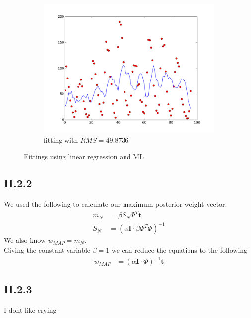 \documentclass{article}
\begin{document}
\begin{figure}[!ht]
\begin{subfigure}[b]{0.5\textwidth}
        \includegraphics[width=\textwidth]{Part2/II213.png}
        \caption{fitting with $RMS = 49.8736$}
    \end{subfigure}
    \caption{Fittings using linear regression and ML}
    \label{fig:II21}
\end{figure}


\subsection{II.2.2}

We used the following to calculate our maximum posterior weight vector.\\
\begin{align*}
    m_{N} &= \beta S_{N} \Phi^{T} \textbf{t}\\
    S_{N} &= (\alpha \textbf{I} \cdot \beta \Phi^{T} \Phi)^{-1}
\end{align*}
We also know $w_{MAP} = m_N$.\\
Giving the constant variable $\beta = 1$ we can reduce the equations to the following\\
\begin{align*}
    w_{MAP} &= (\alpha \textbf{I} \cdot \Phi)^{-1} \textbf{t}
\end{align*}

\subsection{II.2.3}

I dont like crying
\end{document}
